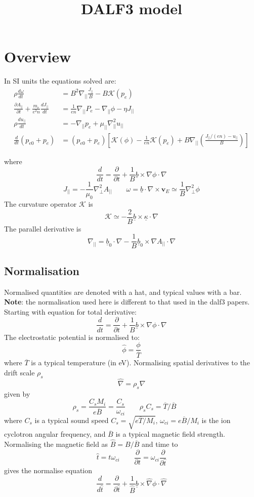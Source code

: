 \documentclass[12pt]{article}
\newcommand{\deriv}[2]{\ensuremath{\frac{\partial #1}{\partial #2}}}
\newcommand{\bvec}{\ensuremath{\underline{b}}}
\newcommand{\kvec}{\ensuremath{\underline{\kappa}}}
\newcommand{\apar}{\ensuremath{A_{||}}}
\begin{document}
\title{DALF3 model}

\maketitle

\section{Overview}

In SI units the equations solved are:
\begin{align}
\rho\frac{d\omega}{dt} &= B^2\nabla_{||}\frac{J_{||}}{B} - B\mathcal{K}\left(p_e\right) \\
\deriv{\apar}{t} + \frac{m_e}{e^2n}\frac{dJ_{||}}{dt} &= \frac{1}{en}\nabla_{||}P_e - \nabla_{||}\phi - \eta J_{||} \\
\rho\frac{du_{||}}{dt} &= -\nabla_{||}p_e + \mu_{||}\nabla_{||}^2u_{||} \\
\frac{d}{dt}\left(p_{e0}+p_e\right) &= \left(p_{e0}+p_e\right)\left[\mathcal{K}\left(\phi\right) - \frac{1}{en}\mathcal{K}\left(p_e\right) + B\nabla_{||}\left(\frac{J_{||}/\left(en\right) - u_{||}}{B}\right)\right]
\end{align}

where 
\[
\frac{d}{dt} = \deriv{}{t} + \frac{1}{B}\bvec\times\nabla\phi\cdot\nabla
\]
\[
J_{||} = -\frac{1}{\mu_0}\nabla_\perp^2 A_{||} \qquad \omega = \bvec\cdot\nabla\times \mathbf{v}_E \simeq \frac{1}{B}\nabla_\perp^2\phi
\]
The curvature operator $\mathcal{K}$ is
\[
\mathcal{K} \simeq -\frac{2}{B}\bvec\times\kvec\cdot\nabla
\]
The parallel derivative is
\[
\nabla_{||} = \bvec_0\cdot\nabla - \frac{1}{B}\bvec_0\times\nabla A_{||}\cdot\nabla
\]

\subsection{Normalisation}

Normalised quantities are denoted with a hat, and typical values with a bar. {\bf Note}: the normalisation used
here is different to that used in the dalf3 papers.
Starting with equation for total derivative:
\[
\frac{d}{dt} = \deriv{}{t} + \frac{1}{B}\bvec\times\nabla \phi \cdot\nabla
\]
The electrostatic potential is normalised to:
\[
\boxed{\hat{\phi} = \frac{\phi}{\overline{T}}}
\]
where $\overline{T}$ is a typical temperature (in eV). Normalising spatial derivatives to the drift scale $\rho_s$
\[
\boxed{\hat{\nabla} = \rho_s\nabla}
\]
given by
\[
\rho_s = \frac{C_s M_i}{e\overline{B}} = \frac{C_s}{\omega_{ci}} \qquad \rho_sC_s = \overline{T} / \overline{B} \qquad 
\]
where $C_s$ is a typical sound speed $C_s = \sqrt{e\overline{T}/M_i}$, $\omega_{ci} = e\overline{B}/M_i$ is the ion
cyclotron angular frequency, and $\overline{B}$ is a typical magnetic field strength. Normalising the magnetic field
as $\boxed{\hat{B} = B / \overline{B}}$ and time to 
\[
\boxed{\hat{t} = t\omega_{ci}} \qquad \deriv{}{t} = \omega_{ci}\deriv{}{\hat{t}}
\]
gives the normalise equation
\[
\frac{d}{d\hat{t}} = \deriv{}{\hat{t}} + \frac{1}{\hat{B}}\bvec\times\hat{\nabla} \phi \cdot\hat{\nabla}
\]
\end{document}
